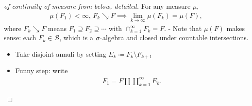 \begin{proof}[of continuity of measure from below, detailed]

For any measure \(\mu\),
\begin{align*}
\mu(F_1) < \infty,\, F_k \searrow F \implies \lim_{k\to\infty}\mu(F_k) = \mu(F)
,\end{align*}
where \(F_k \searrow F\) means \(F_1 \supseteq F_2 \supseteq \cdots\)
with \(\cap_{k=1}^\infty F_k = F\). - Note that \(\mu(F)\) makes sense:
each \(F_k \in \mathcal{B}\), which is a \(\sigma{\hbox{-}}\)algebra and
closed under countable intersections.

\begin{itemize}
\item
  Take disjoint annuli by setting
  \(E_k \coloneqq F_k \setminus F_{k+1}\)
\item
  Funny step: write
  \begin{align*}
  F_1 = F {\textstyle\coprod}\displaystyle\coprod_{k=1}^{\infty} E_k
  .\end{align*}


\end{itemize}
\end{proof}
